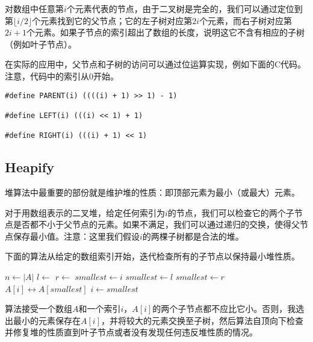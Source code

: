 \documentclass[UTF8]{article}
\begin{document}
对数组中任意第$i$个元素代表的节点，由于二叉树是完全的，我们可以通过定位到第$\lfloor i/2 \rfloor$个元素找到它的父节点；它的左子树对应第$2i$个元素，而右子树对应第$2i+1$个元素。如果子节点的索引超出了数组的长度，说明这它不含有相应的子树（例如叶子节点）。

在实际的应用中，父节点和子树的访问可以通过位运算实现，例如下面的C代码。注意，代码中的索引从0开始。

\lstset{language=C}
\begin{lstlisting}
#define PARENT(i) ((((i) + 1) >> 1) - 1)

#define LEFT(i) (((i) << 1) + 1)

#define RIGHT(i) (((i) + 1) << 1)
\end{lstlisting}

\subsection{Heapify}

堆算法中最重要的部份就是维护堆的性质：即顶部元素为最小（或最大）元素。

对于用数组表示的二叉堆，给定任何索引为$i$的节点，我们可以检查它的两个子节点是否都不小于父节点的元素。如果不满足，我们可以通过递归的交换，使得父节点保存最小值\cite{CLRS}。注意：这里我们假设$i$的两棵子树都是合法的堆。

下面的算法从给定的数组索引开始，迭代检查所有的子节点以保持最小堆性质。

\begin{algorithmic}[1]
  \State $n \gets |A|$
  \Loop
    \State $l \gets$ 
    \State $r \gets$ 
    \State $smallest \gets i$
      \State $smallest \gets l$
    \EndIf
      \State $smallest \gets r$
    \EndIf
      \State {} $A[i] \leftrightarrow A[smallest]$
      \State $i \gets smallest$
    \Else
      \State \Return
    \EndIf
  \EndLoop
\EndFunction
\end{algorithmic}

算法接受一个数组$A$和一个索引$i$，$A[i]$的两个子节点都不应比它小。否则，我选出最小的元素保存在$A[i]$，并将较大的元素交换至子树，然后算法自顶向下检查并修复堆的性质直到叶子节点或者没有发现任何违反堆性质的情况。
\end{document}
